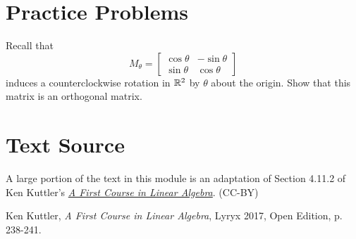\documentclass{ximera}
\begin{document}
\section*{Practice Problems}
\begin{problem}\label{prob:rotationsRorthogonal}
Recall that \begin{equation} 
M_{\theta}=\begin{bmatrix}
\cos\theta & -\sin\theta\\
\sin\theta & \cos\theta
\end{bmatrix}
\end{equation}
induces a counterclockwise rotation in $\mathbb{R}^2$ by $\theta$ about the origin.  Show that this matrix is an orthogonal matrix.
\end{problem}
  
\section*{Text Source}
A large portion of the text in this module is an adaptation of Section 4.11.2 of Ken Kuttler's \href{https://open.umn.edu/opentextbooks/textbooks/a-first-course-in-linear-algebra-2017}{\it A First Course in Linear Algebra}. (CC-BY)

Ken Kuttler, {\it  A First Course in Linear Algebra}, Lyryx 2017, Open Edition, p. 238-241.  
\end{document}
